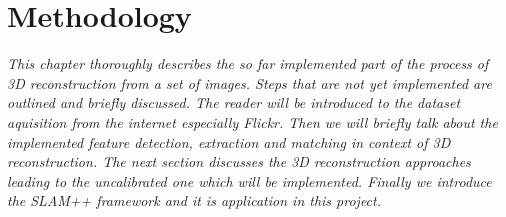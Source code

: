 \chapter{Methodology}
\label{chapter:methodology}
\textit{This chapter thoroughly describes the so far implemented part of the process of 3D reconstruction from a set of images. Steps that are not yet implemented are outlined and briefly discussed. The reader will be introduced to the dataset aquisition from the internet especially Flickr. Then we will briefly talk about the implemented feature detection, extraction and matching in context of 3D reconstruction. The next section discusses the 3D reconstruction approaches leading to the uncalibrated one which will be implemented. Finally we introduce the SLAM++ framework and it is application in this project.}

